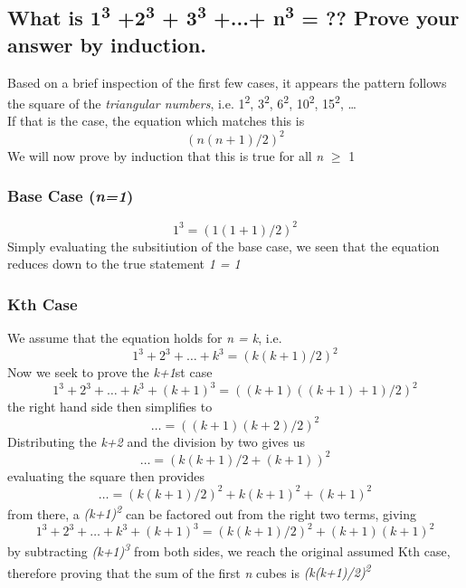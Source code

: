 \documentclass[titlepage]{article}
\numberwithin{equation}{subsection}
\begin{document}
\subsection{What is 1\textsuperscript{3} +2\textsuperscript{3} + 3\textsuperscript{3} +...+ n\textsuperscript{3} = ?? Prove your answer by induction.}
Based on a brief inspection of the first few cases, it appears the pattern follows the square of the \textit{triangular numbers},
i.e. 1\textsuperscript{2}, 3\textsuperscript{2}, 6\textsuperscript{2}, 10\textsuperscript{2}, 15\textsuperscript{2}, \dots\\If that is the case, the equation which matches this is
\begin{equation}
    (n(n+1)/2)^2
\end{equation}
We will now prove by induction that this is true for all \textit{n} $\geq$ 1
\subsubsection{Base Case (\textit{n=1})}
\begin{equation}
    1^3 = (1(1+1)/2)^2
\end{equation}
Simply evaluating the subsitiution of the base case, we seen that the
equation reduces down to the true statement \textit{1 = 1}
\subsubsection{Kth Case}
We assume that the equation holds for \textit{n = k}, i.e.
\begin{equation}
    1^3 + 2^3 + \dots + k^3 = (k(k+1)/2)^2
\end{equation}
Now we seek to prove the \textit{k+1}st case
\begin{equation}
    1^3 + 2^3 + \dots + k^3 + (k+1)^3 = ((k+1)((k+1)+1)/2)^2
\end{equation}
the right hand side then simplifies to
\begin{equation}
    \dots = ((k+1)(k+2)/2)^2
\end{equation}
Distributing the \textit{k+2} and the division by two gives us
\begin{equation}
    \dots = (k(k+1)/2+(k+1))^2
\end{equation}
evaluating the square then provides
\begin{equation}
    \dots = (k(k+1)/2)^2 + k(k+1)^2 + (k+1)^2
\end{equation}
from there, a \textit{(k+1)\textsuperscript{2}} can be factored out from
the right two terms, giving
\begin{equation}
    1^3 + 2^3 + \dots + k^3 + (k+1)^3 = (k(k+1)/2)^2 + (k+1)(k+1)^2
\end{equation}
by subtracting \textit{(k+1)\textsuperscript{3}} from both sides, we
reach the original assumed Kth case, therefore proving that the sum of
the first \textit{n} cubes is \textit{(k(k+1)/2)\textsuperscript{2}}
\end{document}
